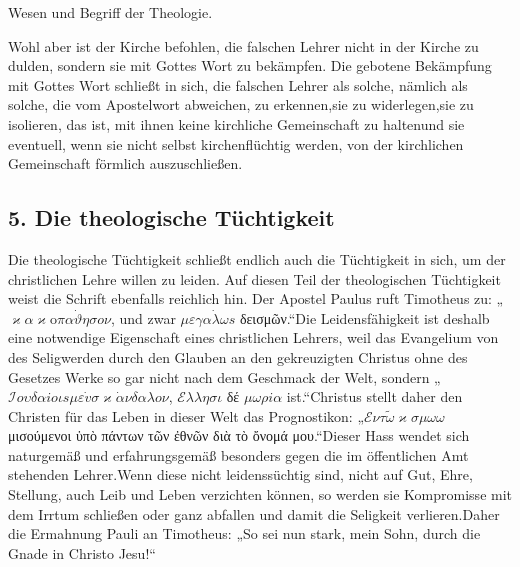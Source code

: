 { Wesen und Begriff der Theologie.\\}

Wohl aber ist der Kirche befohlen, die falschen Lehrer nicht in der Kirche zu dulden, sondern sie mit Gottes Wort zu bekämpfen. Die gebotene Bekämpfung mit Gottes Wort schließt in sich, die falschen Lehrer als solche, nämlich als solche, die vom Apostelwort abweichen, zu erkennen,\footnotemark[190] sie zu widerlegen,\footnotemark[191] sie zu isolieren, das ist, mit ihnen keine kirchliche Gemeinschaft zu halten\footnotemark[192] und sie eventuell, wenn sie nicht selbst kirchenflüchtig werden, von der kirchlichen Gemeinschaft förmlich auszuschließen.\footnotemark[193]

\subsection*{5. Die theologische Tüchtigkeit}
Die theologische Tüchtigkeit schließt endlich auch die Tüchtigkeit in sich, um der christlichen Lehre willen zu leiden. Auf diesen Teil der theologischen Tüchtigkeit weist die Schrift ebenfalls reichlich hin. Der Apostel Paulus ruft Timotheus zu: „$\varkappa \alpha \varkappa \mathrm{o} \pi \alpha \dot{\vartheta} \eta \sigma o \nu$, und zwar $\mu \varepsilon \gamma \alpha \dot{\lambda} \omega s$ δεισμῶν.“\footnotemark[194] Die Leidensfähigkeit ist deshalb eine notwendige Eigenschaft eines christlichen Lehrers, weil das Evangelium von des Seligwerden durch den Glauben an den gekreuzigten Christus ohne des Gesetzes Werke so gar nicht nach dem Geschmack der Welt, sondern „$\mathcal{I} o \upsilon \delta \alpha i o \iota s \mu \varepsilon \dot{v} \sigma \varkappa \dot{\alpha} \nu \delta \alpha \lambda o \nu$, $\mathcal{E} \lambda \lambda \eta \sigma \iota$ δέ $\mu \omega \rho i \alpha$ ist.“\footnotemark[195] Christus stellt daher den Christen für das Leben in dieser Welt das Prognostikon: „$\mathcal{E} \nu \tau \tilde{\omega} \varkappa \sigma \mu \omega \omega$ μισούμενοι ὑπὸ πάντων τῶν ἐθνῶν διὰ τὸ ὄνομά μου.“\footnotemark[196] Dieser Hass wendet sich naturgemäß und erfahrungsgemäß besonders gegen die im öffentlichen Amt stehenden Lehrer.\footnotemark[197] Wenn diese nicht leidenssüchtig sind, nicht auf Gut, Ehre, Stellung, auch Leib und Leben verzichten können, so werden sie Kompromisse mit dem Irrtum schließen oder ganz abfallen und damit die Seligkeit verlieren.\footnotemark[198] Daher die Ermahnung Pauli an Timotheus: „So sei nun stark, mein Sohn, durch die Gnade in Christo Jesu!“\footnotemark[199]

